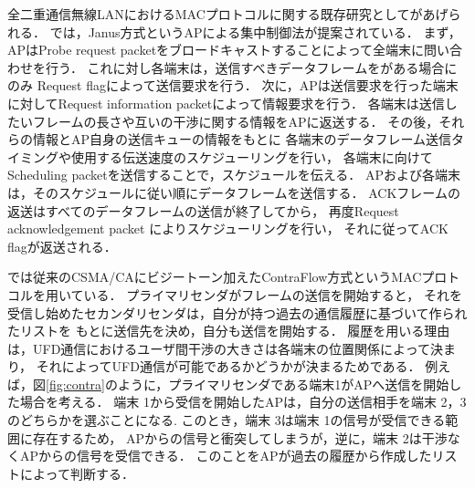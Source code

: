 \documentclass[master]{kuisthesis}		%
\begin{document}
			\par
			全二重通信無線LANにおけるMACプロトコルに関する既存研究として\cite{janus,contra,fdmac}があげられる．
			\cite{janus}では，Janus方式というAPによる集中制御法が提案されている．
			まず，APはProbe request packetをブロードキャストすることによって全端末に問い合わせを行う．
			これに対し各端末は，送信すべきデータフレームをがある場合にのみ
			Request flagによって送信要求を行う．
			次に，APは送信要求を行った端末に対してRequest information packetによって情報要求を行う．
			各端末は送信したいフレームの長さや互いの干渉に関する情報をAPに返送する．
			その後，それらの情報とAP自身の送信キューの情報をもとに
			各端末のデータフレーム送信タイミングや使用する伝送速度のスケジューリングを行い，
			各端末に向けてScheduling packetを送信することで，スケジュールを伝える．
			APおよび各端末は，そのスケジュールに従い順にデータフレームを送信する．
			ACKフレームの返送はすべてのデータフレームの送信が終了してから，
			再度Request acknowledgement packet によりスケジューリングを行い，
			それに従ってACK flagが返送される．

			\par
			\cite{contra}では従来のCSMA/CAにビジートーン加えたContraFlow方式というMACプロトコルを用いている．
			プライマリセンダがフレームの送信を開始すると，
			それを受信し始めたセカンダリセンダは，自分が持つ過去の通信履歴に基づいて作られたリストを
			もとに送信先を決め，自分も送信を開始する．
			履歴を用いる理由は，UFD通信におけるユーザ間干渉の大きさは各端末の位置関係によって決まり，
			それによってUFD通信が可能であるかどうかが決まるためである．
			例えば，図\ref{fig:contra}のように，プライマリセンダである端末1がAPへ送信を開始した場合を考える．
			端末 1から受信を開始したAPは，自分の送信相手を端末 2，3のどちらかを選ぶことになる.
			このとき，端末 3は端末 1の信号が受信できる範囲に存在するため，
			APからの信号と衝突してしまうが，逆に，端末 2は干渉なくAPからの信号を受信できる．
			このことをAPが過去の履歴から作成したリストによって判断する．

\end{document}
